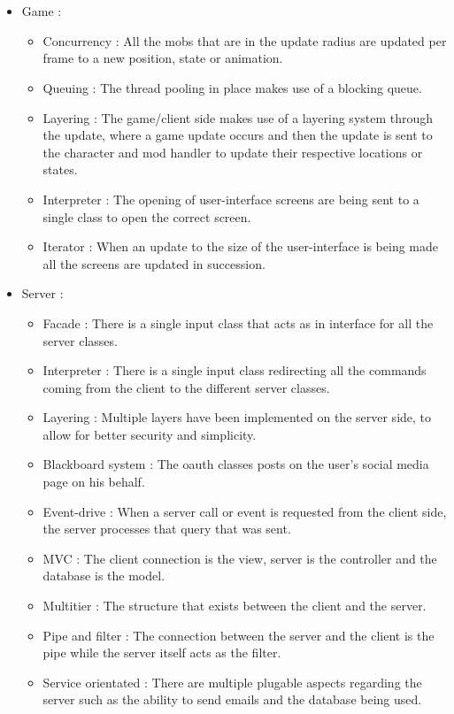 \documentclass[letterpaper]{article}
\begin{document}
		\vspace{0.2in}
			
			
			
		\vspace{0.2in}
		\section*{\colorbox{black}{}}
		\vspace{0.1in}
		\begin{itemize}
		\item Game :
		\begin{itemize}
		\item Concurrency : All the mobs that are in the update radius are updated per frame to a new position, state or animation.
		\item Queuing : The thread pooling in place makes use of a blocking queue.
		\item Layering : The game/client side makes use of a layering system through the update, where a game update occurs and then the update is sent to the character and mod handler to update their respective locations or states.
		\item Interpreter : The opening of user-interface screens are being sent to a single class to open the correct screen.
		\item Iterator : When an update to the size of the user-interface is being made all the screens are updated in succession.
		\end{itemize}
		\item Server :
		\begin{itemize}
		\item Facade : There is a single input class that acts as in interface for all the server classes.
		\item Interpreter : There is a single input class redirecting all the commands coming from the client to the different server classes.
		\item Layering : Multiple layers have been implemented on the server side, to allow for better security and simplicity.
		\item Blackboard system : The oauth classes posts on the user's social media page on his behalf.
		\item Event-drive : When a server call or event is requested from the client side, the server processes that query that was sent. 
		\item MVC : The client connection is the view, server is the controller and the database is the model.
		\item Multitier : The structure that exists between the client and the server.
		\item Pipe and filter : The connection between the server and the client is the pipe while the server itself acts as the filter.
		\item Service orientated : There are multiple plugable aspects regarding the server such as the ability to send emails and the database being used.
		\end{itemize}
		\end{itemize}
\end{document}
